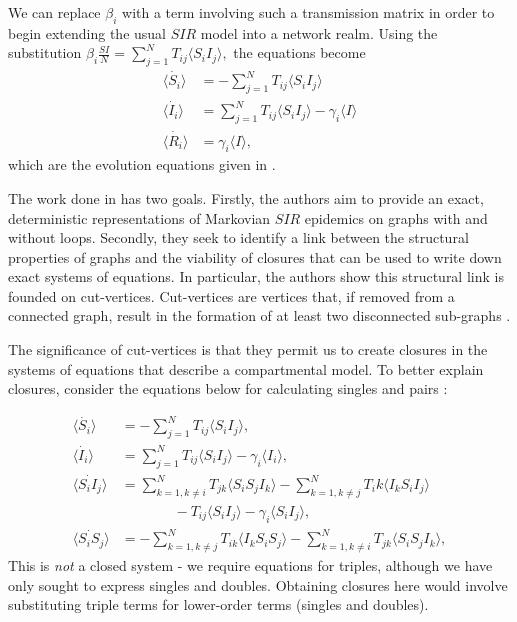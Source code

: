 \documentclass[../report.tex]{subfiles}
\begin{document}
We can replace $\beta_i$ with a term involving such a transmission matrix in order to begin extending the usual $SIR$ model into a network realm. Using the substitution $ \beta_i \frac{SI}{N} = \sum^{N}_{j=1}T_{ij} \langle S_i I_j \rangle,$ the equations become
\begin{align*}
\dot{\langle S_i \rangle} & = -\sum^{N}_{j=1}T_{ij} \langle S_i I_j \rangle\\
\dot{\langle I_i \rangle} & =\sum^{N}_{j=1}T_{ij}\langle S_i I_j \rangle - \gamma_i \langle I \rangle \\
\dot{\langle R_i \rangle} & = \gamma_i \langle I \rangle,
\end{align*}
which are the evolution equations given in \cite{kiss_2014}.

The work done in \cite{kiss_2014} has two goals. Firstly, the authors aim to provide an exact, deterministic representations of Markovian $SIR$ epidemics on graphs with and without loops. Secondly, they seek to identify a link between the structural properties of graphs and the viability of closures that can be used to write down exact systems of equations. In particular, the authors show this structural link is founded on cut-vertices. Cut-vertices are vertices that, if removed from a connected graph, result in the formation of at least two disconnected sub-graphs \cite{kiss_2014}.

The significance of cut-vertices is that they permit us to create closures in the systems of equations that describe a compartmental model. To better explain closures, consider the equations below for calculating singles and pairs \cite{kiss_2014}:

\begin{align*}
\langle \dot{S_i} \rangle & = -\sum^N_{j=1}T_{ij}\langle S_iI_j\rangle,\\
\langle\dot{I_i}\rangle & = \sum^N_{j=1}T_{ij}\langle S_iI_j\rangle - \gamma_i\langle I_i \rangle,\\
\langle\dot{S_iI_j}\rangle & = \sum^N_{k=1,k\neq i}T_{jk}\langle S_i S_j I_k \rangle - \sum^N_{k=1,k\neq j}T_ik\langle I_k S_i I_j \rangle \\ 
			    	      & ~~~~~~~~~~~~~~~~~- T_{ij}\langle S_iI_j \rangle - \gamma_i\langle S_i I_j \rangle,\\
\langle \dot{S_i S_j}\rangle & = - \sum^N_{k=1,k\neq j}T_{ik}\langle I_k S_i S_j \rangle - \sum^N_{k=1,k\neq i}T_{jk}\langle S_i S_j I_k \rangle,
\end{align*}
This is {\it not} a closed system - we require equations for triples, although we have only sought to express singles and doubles. Obtaining closures here would involve substituting triple terms for lower-order terms (singles and doubles).
\end{document}
